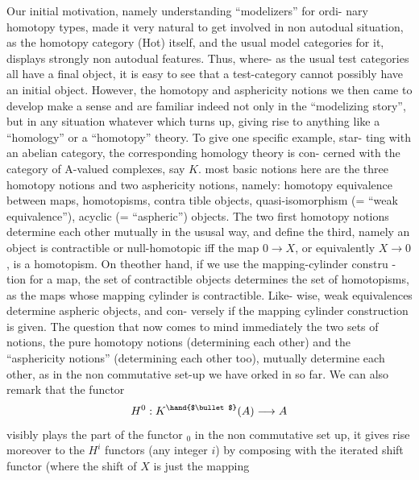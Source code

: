 Our initial motivation,  namely understanding ``modelizers'' for ordi-%
nary homotopy types,  made it very natural to get involved in non autodual
situation,  as the homotopy category (Hot) itself,  and the usual model
categories for it,  displays strongly non autodual features. \hand{(}Thus,  where-%
as the usual test categories all have a final object,  it is easy to see
that a test-category cannot possibly have an initial object.\hand{)} However,
the homotopy and asphericity notions we then came to develop make a sense
and are familiar indeed not only in the ``modelizing story'',  but 
 in any situation whatever which turns up,  giving rise to anything like
a ``homology'' or a ``homotopy'' theory.  To give one specific example,  star-%
ting with an abelian category,  the corresponding homology theory is con-%
cerned with the category of A-valued  complexes,  say $K$.   most
basic notions here are the three homotopy notions and two asphericity
notions,  namely:  homotopy equivalence between maps,  homotopisms,  contra
tible objects, quasi-isomorphism (= ``weak equivalence''),  acyclic (=
``aspheric'') objects.  The two first homotopy notions determine each other
mutually in the ususal way,  and define the third,  namely an object is
contractible  \hand{(}or null-homotopic\hand{)} iff the map $0\to X$,  or equivalently $X\to 0$,
is a homotopism.  On the\hand{/}other hand,  if we use the mapping-cylinder constru
-tion for a map,  the  set of contractible objects determines the set
of homotopisms,  as the maps whose mapping cylinder is contractible.  Like-%
wise,  weak equivalences determine  aspheric objects,  and con-%
versely if the mapping cylinder construction is given.  The question that
now comes to mind immediately  the two sets of notions,  the pure
homotopy notions (determining each other)\hand{,} and the ``asphericity notions''
(determining each other too),  mutually determine each other,  as in the
non commutative set-up we have orked in so far.  We can also remark that
the functor
\[ H^{0} : K^{\hand{$\bullet$}}(A) \longrightarrow A \]
visibly plays the part of the functor \hand{$\pi$}$_{0}$ in the non commutative set up,
it gives rise moreover to the $H^{i}$ functors (any integer $i$) by composing
with the iterated shift functor  (where the shift of $X$ is just the mapping
